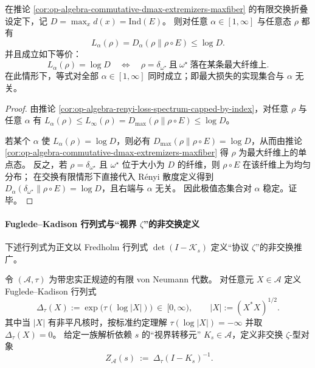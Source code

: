 \begin{corollary}\label{cor:op-algebra-commutative-renyi-extremizers-alpha-stable}
在推论 \ref{cor:op-algebra-commutative-dmax-extremizers-maxfiber} 的有限交换折叠设定下，记 \(D=\max_x d(x)=\mathrm{Ind}(E)\)。
则对任意 \(\alpha\in[1,\infty]\) 与任意态 \(\rho\) 都有
\[
L_\alpha(\rho)=D_\alpha(\rho\|\rho\!\circ\!E)\le \log D.
\]
并且成立如下等价：
\[
L_\alpha(\rho)=\log D
\quad\Longleftrightarrow\quad
\rho=\delta_{\omega^\star}\ \text{且}\ \omega^\star\ \text{落在某条最大纤维上}.
\]
在此情形下，等式对全部 \(\alpha\in[1,\infty]\) 同时成立；即最大损失的实现集合与 \(\alpha\) 无关。
\end{corollary}
\begin{proof}
由推论 \ref{cor:op-algebra-renyi-loss-spectrum-capped-by-index}，对任意 \(\rho\) 与任意 \(\alpha\) 有 \(L_\alpha(\rho)\le L_\infty(\rho)=D_{\max}(\rho\|\rho\!\circ\!E)\le \log D\)。
\par
若某个 \(\alpha\) 使 \(L_\alpha(\rho)=\log D\)，则必有 \(D_{\max}(\rho\|\rho\!\circ\!E)=\log D\)，从而由推论 \ref{cor:op-algebra-commutative-dmax-extremizers-maxfiber} 得 \(\rho\) 为最大纤维上的单点态。
反之，若 \(\rho=\delta_{\omega^\star}\) 且 \(\omega^\star\) 位于大小为 \(D\) 的纤维，则 \(\rho\!\circ\!E\) 在该纤维上为均匀分布；
在交换有限情形下直接代入 Rényi 散度定义得到 \(D_\alpha(\delta_{\omega^\star}\|\rho\!\circ\!E)=\log D\)，且右端与 \(\alpha\) 无关。
因此极值态集合对 \(\alpha\) 稳定。证毕。
\end{proof}

\paragraph{Fuglede--Kadison 行列式与“视界 \texorpdfstring{$\zeta$}{zeta}”的非交换定义}
下述行列式为正文以 Fredholm 行列式 \(\det(I-\mathcal{K}_s)\) 定义“协议 \(\zeta\)”的非交换推广。

\begin{definition}\label{def:op-algebra-fk-determinant-zeta}
令 \((\mathcal{A},\tau)\) 为带忠实正规迹的有限 von Neumann 代数。
对任意元 \(X\in\mathcal{A}\) 定义 Fuglede--Kadison 行列式
\begin{equation}\label{eq:op-algebra-fkdet}
\boxed{\;\Delta_\tau(X):=\exp\bigl(\tau(\log|X|)\bigr)\ \in\ [0,\infty),\qquad |X|:=(X^\ast X)^{1/2}.\;}
\end{equation}
其中当 \(|X|\) 有非平凡核时，按标准约定理解 \(\tau(\log|X|)=-\infty\) 并取 \(\Delta_\tau(X)=0\)。
给定一族解析依赖 \(s\) 的“视界转移元” \(K_s\in\mathcal{A}\)，定义非交换 \(\zeta\)-型对象
\begin{equation}\label{eq:op-algebra-nc-zeta}
\boxed{\;
Z_{\mathcal{A}}(s)\ :=\ \Delta_\tau(I-K_s)^{-1}.
}
\end{equation}
\end{definition}

